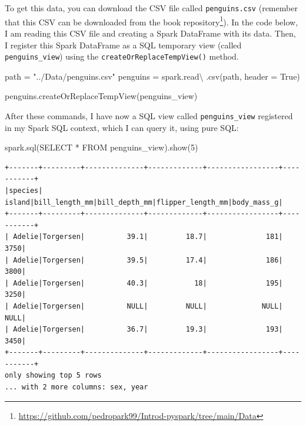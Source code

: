 \documentclass[
  11pt,
  letterpaper,
  DIV=11,
  numbers=noendperiod]{scrreprt}
\newenvironment{Shaded}{\begin{snugshade}}{\end{snugshade}}
\newcommand{\DecValTok}[1]{\textcolor[rgb]{0.68,0.00,0.00}{#1}}
\newcommand{\NormalTok}[1]{\textcolor[rgb]{0.00,0.23,0.31}{#1}}
\newcommand{\OperatorTok}[1]{\textcolor[rgb]{0.37,0.37,0.37}{#1}}
\newcommand{\StringTok}[1]{\textcolor[rgb]{0.13,0.47,0.30}{#1}}
\newcommand{\VariableTok}[1]{\textcolor[rgb]{0.07,0.07,0.07}{#1}}
\begin{document}
To get this data, you can download the CSV file called
\texttt{penguins.csv} (remember that this CSV can be downloaded from the
book repository\footnote{\url{https://github.com/pedropark99/Introd-pyspark/tree/main/Data}}).
In the code below, I am reading this CSV file and creating a Spark
DataFrame with its data. Then, I register this Spark DataFrame as a SQL
temporary view (called \texttt{penguins\_view}) using the
\texttt{createOrReplaceTempView()} method.

\begin{Shaded}
\begin{Highlighting}[]
\NormalTok{path }\OperatorTok{=} \StringTok{"../Data/penguins.csv"}
\NormalTok{penguins }\OperatorTok{=}\NormalTok{ spark.read}\OperatorTok{\textbackslash{}}
\NormalTok{  .csv(path, header }\OperatorTok{=} \VariableTok{True}\NormalTok{)}
  
\NormalTok{penguins.createOrReplaceTempView(}\StringTok{\textquotesingle{}penguins\_view\textquotesingle{}}\NormalTok{)}
\end{Highlighting}
\end{Shaded}

After these commands, I have now a SQL view called
\texttt{penguins\_view} registered in my Spark SQL context, which I can
query it, using pure SQL:

\begin{Shaded}
\begin{Highlighting}[]
\NormalTok{spark.sql(}\StringTok{\textquotesingle{}SELECT * FROM penguins\_view\textquotesingle{}}\NormalTok{).show(}\DecValTok{5}\NormalTok{)}
\end{Highlighting}
\end{Shaded}

\begin{verbatim}
+-------+---------+--------------+-------------+-----------------+-----------+
|species|   island|bill_length_mm|bill_depth_mm|flipper_length_mm|body_mass_g|
+-------+---------+--------------+-------------+-----------------+-----------+
| Adelie|Torgersen|          39.1|         18.7|              181|       3750|
| Adelie|Torgersen|          39.5|         17.4|              186|       3800|
| Adelie|Torgersen|          40.3|           18|              195|       3250|
| Adelie|Torgersen|          NULL|         NULL|             NULL|       NULL|
| Adelie|Torgersen|          36.7|         19.3|              193|       3450|
+-------+---------+--------------+-------------+-----------------+-----------+
only showing top 5 rows
... with 2 more columns: sex, year
\end{verbatim}
\end{document}
